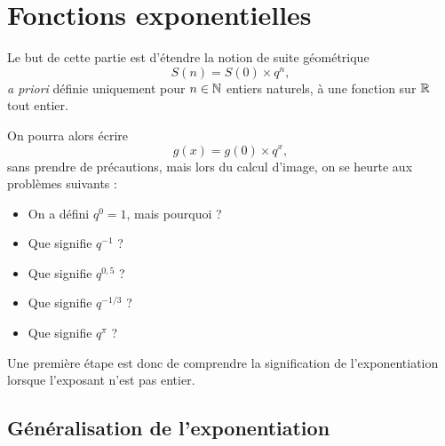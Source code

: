 
\chapter{Fonctions exponentielles}

Le but de cette partie est d'étendre la notion de suite géométrique
	\[ S(n) = S(0) \times q^n, \]
\emph{a priori} définie uniquement pour $n\in\mathbb{N}$ entiers naturels, à une fonction sur $\mathbb{R}$ tout entier.

On pourra alors écrire
	\[ g(x) = g(0) \times q^x, \]
sans prendre de précautions, mais lors du calcul d'image, on se heurte aux problèmes suivants :
	\begin{itemize}
		\item On a défini $q^0 = 1$, mais pourquoi ?
		\item Que signifie $q^{-1}$ ?
		\item Que signifie $q^{0,5}$ ?
		\item Que signifie $q^{-1/3}$ ?
		\item Que signifie $q^{\pi}$ ?
	\end{itemize}
Une première étape est donc de comprendre la signification de l'exponentiation lorsque l'exposant n'est pas entier.

\section{Généralisation de l'exponentiation}





